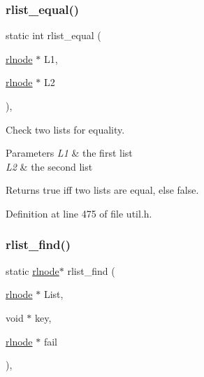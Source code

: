 \subsubsection{\texorpdfstring{rlist\+\_\+equal()}{rlist\_equal()}}
{\footnotesize\ttfamily static int rlist\+\_\+equal (\begin{DoxyParamCaption}\item[{\hyperlink{group__rlists_ga8f6244877f7ce2322c90525217ea6e7a}{rlnode} $\ast$}]{L1,  }\item[{\hyperlink{group__rlists_ga8f6244877f7ce2322c90525217ea6e7a}{rlnode} $\ast$}]{L2 }\end{DoxyParamCaption})\hspace{0.3cm}{\ttfamily [inline]}, {\ttfamily [static]}}



Check two lists for equality. 


\begin{DoxyParams}{Parameters}
{\em L1} & the first list \\
\hline
{\em L2} & the second list \\
\hline
\end{DoxyParams}
\begin{DoxyReturn}{Returns}
true iff two lists are equal, else false. 
\end{DoxyReturn}


Definition at line 475 of file util.\+h.

\mbox{\label{group__rlists_gafbb3a5edeac9f1d43130528292c47cf6}} 
\subsubsection{\texorpdfstring{rlist\+\_\+find()}{rlist\_find()}}
{\footnotesize\ttfamily static \hyperlink{group__rlists_ga8f6244877f7ce2322c90525217ea6e7a}{rlnode}$\ast$ rlist\+\_\+find (\begin{DoxyParamCaption}\item[{\hyperlink{group__rlists_ga8f6244877f7ce2322c90525217ea6e7a}{rlnode} $\ast$}]{List,  }\item[{void $\ast$}]{key,  }\item[{\hyperlink{group__rlists_ga8f6244877f7ce2322c90525217ea6e7a}{rlnode} $\ast$}]{fail }\end{DoxyParamCaption})\hspace{0.3cm}{\ttfamily [inline]}, {\ttfamily [static]}}



